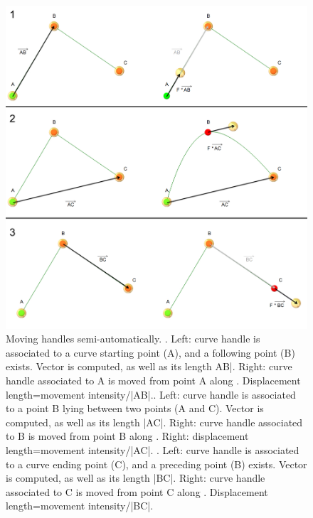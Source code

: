 \begin{figure}
  \centering
  \includegraphics[scale=0.3]{images/Edit_selected_landmarks/Move_2.pdf} 
	\caption{ Moving handles semi-automatically. . Left: curve handle is associated to a curve starting point (A), and a following point (B) exists. Vector  is computed, as well as its length AB|. Right: curve handle associated to A is moved from point A along . Displacement length=movement intensity/|AB|.. Left: curve handle is associated to a point B lying between two points (A and C). Vector  is computed, as well as its length |AC|. Right: curve handle associated to B is moved from point B along . Right: displacement length=movement intensity/|AC|.  . Left: curve handle is associated to a curve ending point (C), and a preceding point (B) exists. Vector  is computed, as well as its length |BC|. Right: curve handle associated to C is moved from point C along . Displacement length=movement intensity/|BC|.}
\label{move_handles}
 
\end{figure}

